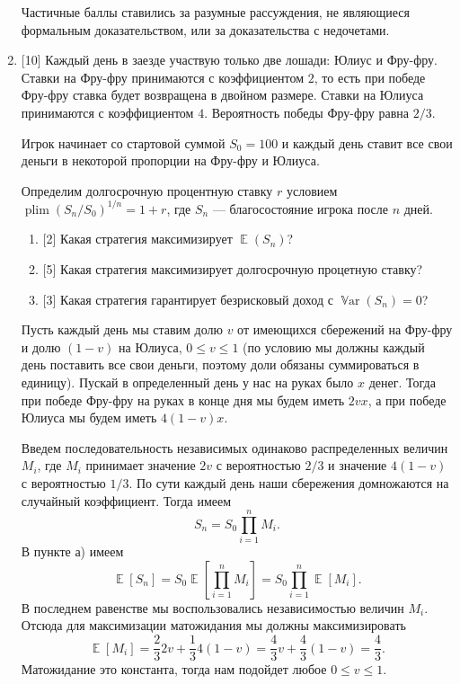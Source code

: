 \documentclass[12pt]{article}
\DeclareMathOperator{\Var}{\mathbb{V}ar}
\DeclareMathOperator{\E}{\mathbb{E}}
\DeclareMathOperator{\plim}{plim}
\begin{document}
\begin{enumerate}
Частичные баллы ставились за разумные рассуждения, не являющиеся формальным доказательством, или за доказательства с недочетами.




\item {[10]} Каждый день в заезде участвую только две лошади: Юлиус и Фру-фру. 
Ставки на Фру-фру принимаются с коэффициентом $2$, то есть при победе Фру-фру ставка будет возвращена в двойном размере. 
Ставки на Юлиуса принимаются с коэффициентом $4$.
Вероятность победы Фру-фру равна $2/3$.

Игрок начинает со стартовой суммой $S_0 = 100$ и каждый день ставит все свои деньги в некоторой пропорции на Фру-фру и Юлиуса. 

Определим долгосрочную процентную ставку $r$ условием $\plim (S_n / S_0)^{1/n} = 1 + r$, где $S_n$ — благосостояние игрока после $n$ дней.
\begin{enumerate}
    \item {[2]} Какая стратегия максимизирует $\E(S_n)$?
    \item {[5]} Какая стратегия максимизирует долгосрочную процетную ставку?
    \item {[3]} Какая стратегия гарантирует безрисковый доход с $\Var(S_n) = 0$?
\end{enumerate}


Пусть каждый день мы ставим долю $v$ от имеющихся сбережений на Фру-фру и долю $(1 - v)$ на Юлиуса, $0 \le v \le 1$ (по условию мы должны каждый день поставить все свои деньги, поэтому доли обязаны суммироваться в единицу). Пускай в определенный день у нас на руках было $x$ денег. Тогда при победе Фру-фру на руках в конце дня мы будем иметь $2vx$, а при победе Юлиуса мы будем иметь $4(1-v)x$.

\vspace{0.3cm}

Введем последовательность независимых одинаково распределенных величин $M_i$, где $M_i$ принимает значение $2v$ с вероятностью $2/3$ и значение $4(1-v)$ с вероятностью $1/3$. По сути каждый день наши сбережения домножаются на случайный коэффициент. Тогда имеем 
\[
S_n = S_0 \prod_{i=1}^n M_i.
\]
В пункте а) имеем 
\[
\E[S_n] = S_0 \E\left[  \prod_{i=1}^n M_i \right] =S_0 \prod_{i=1}^n \E[M_i].
\]
В последнем равенстве мы воспользовались независимостью величин $M_i$. Отсюда для максимизации матожидания мы должны максимизировать $$\E[M_i] = \frac{2}{3}2v + \frac{1}{3}4(1 - v) = \frac{4}{3}v + \frac{4}{3}(1-v) = \frac{4}{3}.$$
Матожидание это константа, тогда нам подойдет любое $0 \le v \le 1$.


\end{enumerate}
\end{document}

